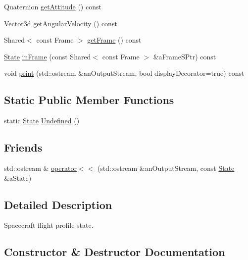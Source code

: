 \begin{DoxyCompactItemize}
Quaternion \hyperlink{classostk_1_1astro_1_1flight_1_1profile_1_1_state_a8b765a7ebcfc0a7202bce31cafbc3a30}{get\+Attitude} () const
\item 
Vector3d \hyperlink{classostk_1_1astro_1_1flight_1_1profile_1_1_state_acd3702013017327ab64023ff86d1c3c2}{get\+Angular\+Velocity} () const
\item 
Shared$<$ const Frame $>$ \hyperlink{classostk_1_1astro_1_1flight_1_1profile_1_1_state_a6e06bfcca971466bf36c2c0a0837e429}{get\+Frame} () const
\item 
\hyperlink{classostk_1_1astro_1_1flight_1_1profile_1_1_state}{State} \hyperlink{classostk_1_1astro_1_1flight_1_1profile_1_1_state_ab5f93d12e52218cc6d5684a5a9519b87}{in\+Frame} (const Shared$<$ const Frame $>$ \&a\+Frame\+S\+Ptr) const
\item 
void \hyperlink{classostk_1_1astro_1_1flight_1_1profile_1_1_state_afc8060bca36e76f1b3b7f2ab8ad6df16}{print} (std\+::ostream \&an\+Output\+Stream, bool display\+Decorator=true) const
\end{DoxyCompactItemize}
\subsection*{Static Public Member Functions}
\begin{DoxyCompactItemize}
\item 
static \hyperlink{classostk_1_1astro_1_1flight_1_1profile_1_1_state}{State} \hyperlink{classostk_1_1astro_1_1flight_1_1profile_1_1_state_af18b40557aa14bfd0b46d14ad04d33fc}{Undefined} ()
\end{DoxyCompactItemize}
\subsection*{Friends}
\begin{DoxyCompactItemize}
\item 
std\+::ostream \& \hyperlink{classostk_1_1astro_1_1flight_1_1profile_1_1_state_abba03f039f2534d691a1dc28426e8b89}{operator$<$$<$} (std\+::ostream \&an\+Output\+Stream, const \hyperlink{classostk_1_1astro_1_1flight_1_1profile_1_1_state}{State} \&a\+State)
\end{DoxyCompactItemize}


\subsection{Detailed Description}
Spacecraft flight profile state. 

\subsection{Constructor \& Destructor Documentation}
\mbox{\label{classostk_1_1astro_1_1flight_1_1profile_1_1_state_aa68f2e3268146c8bcb581beb8dcd5412}} 
